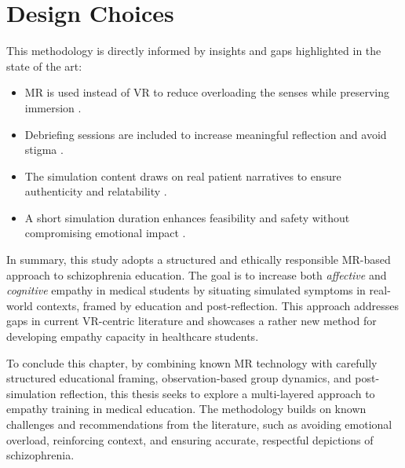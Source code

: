 \section{Design Choices}

This methodology is directly informed by insights and gaps highlighted in the state of the art:

\begin{itemize}
    \item MR is used instead of VR to reduce overloading the senses while preserving immersion \cite{Krogmeier2024}.
    \item Debriefing sessions are included to increase meaningful reflection and avoid stigma \cite{Rueda2020, Ando2011}.
    \item The simulation content draws on real patient narratives to ensure authenticity and relatability \cite{Zare-Bidaki2022}.
    \item A short simulation duration enhances feasibility and safety without compromising emotional impact \cite{Formosa2018}.
\end{itemize}

In summary, this study adopts a structured and ethically responsible MR-based approach to schizophrenia education. The goal is to increase both \textit{affective} and \textit{cognitive} empathy in medical students by situating simulated symptoms in real-world contexts, framed by education and post-reflection. This approach addresses gaps in current VR-centric literature and showcases a rather new method for developing empathy capacity in healthcare students.


To conclude this chapter, by combining known MR technology with carefully structured educational framing, observation-based group dynamics, and post-simulation reflection, this thesis seeks to explore a multi-layered approach to empathy training in medical education. The methodology builds on known challenges and recommendations from the literature, such as avoiding emotional overload, reinforcing context, and ensuring accurate, respectful depictions of schizophrenia. 
